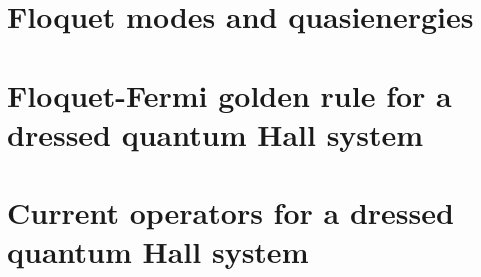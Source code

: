 \documentclass[%
 reprint,
 amsmath,amssymb,
 aps,
prb,
]{revtex4-2}
\begin{document}
\section{\label{appendix_b} Floquet modes and quasienergies}


\section{\label{appendix_c} Floquet-Fermi golden rule for a dressed quantum  Hall system}


\section{\label{appendix_d} Current operators for a dressed quantum Hall system}


\nocite{*}

\end{document}
